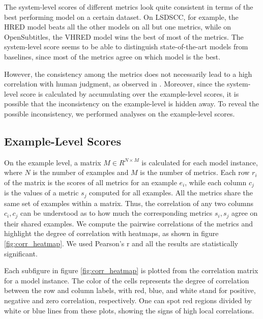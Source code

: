 \documentclass[conference]{IEEEtran}
\begin{document}
The system-level scores of different metrics look quite consistent in terms of the best performing model on a certain dataset. On LSDSCC, for example, the HRED model beats all the other models on all but one metrics, while on OpenSubtitles, the VHRED model wins the best of most of the metrics. The system-level score seems to be able to distinguish state-of-the-art models from baselines, since most of the metrics agree on which model is the best.

However, the consistency among the metrics does not necessarily lead to a high correlation with human judgment, as observed in \cite{HowNot}. Moreover, since the system-level score is calculated by accumulating over the example-level scores, it is possible that the inconsistency on the example-level is hidden away. To reveal the possible inconsistency, we performed analyses on the example-level scores.

\subsection{Example-Level Scores}
On the example level, a matrix $M \in R^{N \times M}$ is calculated for each model instance, where $N$ is the number of examples and $M$ is the number of metrics. Each row $r_i$ of the matrix is the scores of all metrics for an example $e_i$, while each column $c_j$ is the values of a metric $s_j$ computed for all examples. All the metrics share the same set of examples within a matrix. Thus, the correlation of any two columns $c_i, c_j$ can be understood as to how much the corresponding metrics $s_i, s_j$ agree on their shared examples. We compute the pairwise correlations of the metrics and highlight the degree of correlation with heatmaps, as shown in figure \ref{fig:corr_heatmap}. We used Pearson's r and all the results are statistically significant.



Each subfigure in figure \ref{fig:corr_heatmap} is plotted from the correlation matrix for a model instance. The color of the cells represents the degree of correlation between the row and column labels, with red, blue, and white stand for positive, negative and zero correlation, respectively. One can spot red regions divided by white or blue lines from these plots, showing the signs of high local correlations.
\end{document}
